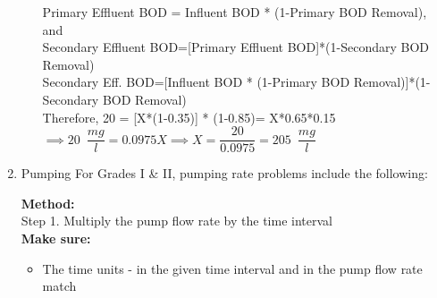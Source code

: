 \documentclass{article}
\begin{document}
\begin{enumerate}
\begin{enumerate}
Primary Effluent BOD = Influent BOD * (1-Primary BOD Removal), and\\
Secondary Effluent BOD=[Primary Effluent BOD]*(1-Secondary BOD Removal)\\
Secondary Eff. BOD=[Influent BOD * (1-Primary BOD Removal)]*(1-Secondary BOD Removal)\\

Therefore, 20 = [X*(1-0.35)] * (1-0.85)= X*0.65*0.15\\
$\implies 20 \enspace \dfrac{mg}{l}= 0.0975X \implies X=\dfrac{20}{0.0975}=\boxed{205 \enspace \dfrac{mg}{l}}$

\end{enumerate}
\item Pumping
For Grades I \& II, pumping rate problems include the following:


\textbf{Method:\\}
\hspace{1cm}Step 1. Multiply the pump flow rate by the time interval\\
\textbf{Make sure:}
\begin{itemize}
\item The time units - in the given time interval and in the pump flow rate match
\end{itemize}

\end{enumerate}
\end{document}
